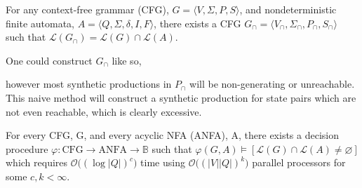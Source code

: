 \documentclass[sigplan,review,acmsmall,nonacm,screen,anonymous]{acmart}\settopmatter{printfolios=false,printccs=false,printacmref=false}
\begin{document}
  \begin{theorem}
    For any context-free grammar (CFG), $G = \langle V, \Sigma, P, S\rangle$, and nondeterministic finite automata, $A = \langle Q, \Sigma, \delta, I, F\rangle$, there exists a CFG \(G_\cap=\langle V_\cap, \Sigma_\cap, P_\cap, S_\cap\rangle\) such that $\mathcal{L}(G_\cap) = \mathcal{L}(G)\cap\mathcal{L}(A)$.
  \end{theorem}

  \begin{definition}[Salomaa, 1973]
    One could construct $G_\cap$ like so,

    \noindent{}
    however most synthetic productions in $P_\cap$ will be non-generating or unreachable. This naive method will construct a synthetic production for state pairs which are not even reachable, which is clearly excessive.
  \end{definition}

  \begin{theorem}%
    For every CFG, G, and every acyclic NFA (ANFA), A, there exists a decision procedure $\varphi: \text{CFG} \rightarrow \text{ANFA} \rightarrow \mathbb{B}$ such that $\varphi(G, A) \models [\mathcal{L}(G)\cap\mathcal{L}(A) \neq \varnothing]$ which requires $\mathcal{O}\big((\log |Q|)^c\big)$ time using $\mathcal{O}\big((|V||Q|)^k\big)$ parallel processors for some $c, k < \infty$.
  \end{theorem}
\end{document}
